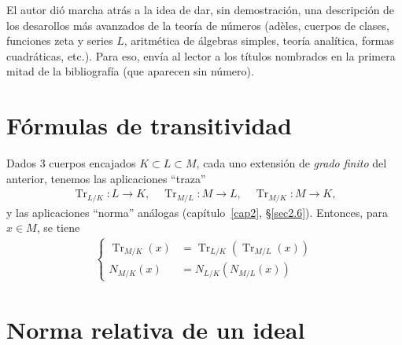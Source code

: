 \documentclass[bibtotoc,leqno,spanish]{amsbook}
\renewcommand{\to}[1][]{\xrightarrow{#1}}
\DeclareMathOperator{\Tr}{Tr}
\numberwithin{equation}{section}
\theoremstyle{note}
\theoremstyle{note}
\theoremstyle{rem}
\numberwithin{theorem}{section}
\numberwithin{proposition}{section}
\numberwithin{definition}{section}
\numberwithin{lemma}{section}
\numberwithin{corollary}{section}
\numberwithin{example}{section}
\numberwithin{footnote}{section}%
\begin{document}
El autor di\'o marcha atr\'as a la idea de dar, sin demostraci\'on, una descripci\'on de los desarollos m\'as avanzados
de la teor\'ia de n\'umeros (ad\`eles, cuerpos de clases, funciones zeta y series $L$, aritm\'etica de \'algebras
simples, teor\'ia anal\'itica, formas cuadr\'aticas, etc.). Para eso, env\'ia al lector a los t\'itulos nombrados
en la primera mitad de la bibliograf\'ia (que aparecen sin n\'umero).

\section*{F\'ormulas de transitividad}

Dados $3$ cuerpos encajados $K\subset L\subset M$, cada uno extensi\'on de {\em grado finito} del anterior, tenemos las
aplicaciones ``traza''
\begin{gather*}
\Tr_{L/K}:L\to K,\quad\Tr_{M/L}:M\to L,\quad\Tr_{M/K}:M\to K,
\end{gather*}
y las aplicaciones ``norma'' an\'alogas (cap\'itulo~\ref{cap2}, \S\ref{sec2.6}). Entonces, para $x\in M$, se tiene
\begin{gather}
\left\{\begin{aligned}
\Tr_{M/K}(x) &= \Tr_{L/K}(\Tr_{M/L}(x))\\
N_{M/K}(x) &= N_{L/K}(N_{M/L}(x))
\end{aligned}
\right.
\end{gather}

\section*{Norma relativa de un ideal}
\end{document}
